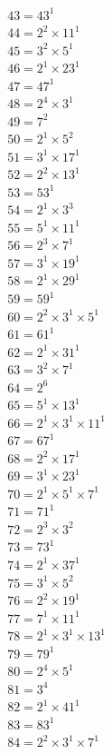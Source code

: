 \begin{equation*}
\begin{aligned}
& 43 = 43^{1} \\
& 44 = 2^{2} × 11^{1} \\
& 45 = 3^{2} × 5^{1} \\
& 46 = 2^{1} × 23^{1} \\
& 47 = 47^{1} \\
& 48 = 2^{4} × 3^{1} \\
& 49 = 7^{2} \\
& 50 = 2^{1} × 5^{2} \\
& 51 = 3^{1} × 17^{1} \\
& 52 = 2^{2} × 13^{1} \\
& 53 = 53^{1} \\
& 54 = 2^{1} × 3^{3} \\
& 55 = 5^{1} × 11^{1} \\
& 56 = 2^{3} × 7^{1} \\
& 57 = 3^{1} × 19^{1} \\
& 58 = 2^{1} × 29^{1} \\
& 59 = 59^{1} \\
& 60 = 2^{2} × 3^{1} × 5^{1} \\
& 61 = 61^{1} \\
& 62 = 2^{1} × 31^{1} \\
& 63 = 3^{2} × 7^{1} \\
& 64 = 2^{6} \\
& 65 = 5^{1} × 13^{1} \\
& 66 = 2^{1} × 3^{1} × 11^{1} \\
& 67 = 67^{1} \\
& 68 = 2^{2} × 17^{1} \\
& 69 = 3^{1} × 23^{1} \\
& 70 = 2^{1} × 5^{1} × 7^{1} \\
& 71 = 71^{1} \\
& 72 = 2^{3} × 3^{2} \\
& 73 = 73^{1} \\
& 74 = 2^{1} × 37^{1} \\
& 75 = 3^{1} × 5^{2} \\
& 76 = 2^{2} × 19^{1} \\
& 77 = 7^{1} × 11^{1} \\
& 78 = 2^{1} × 3^{1} × 13^{1} \\
& 79 = 79^{1} \\
& 80 = 2^{4} × 5^{1} \\
& 81 = 3^{4} \\
& 82 = 2^{1} × 41^{1} \\
& 83 = 83^{1} \\
& 84 = 2^{2} × 3^{1} × 7^{1} \\

\end{aligned}
\end{equation*}
